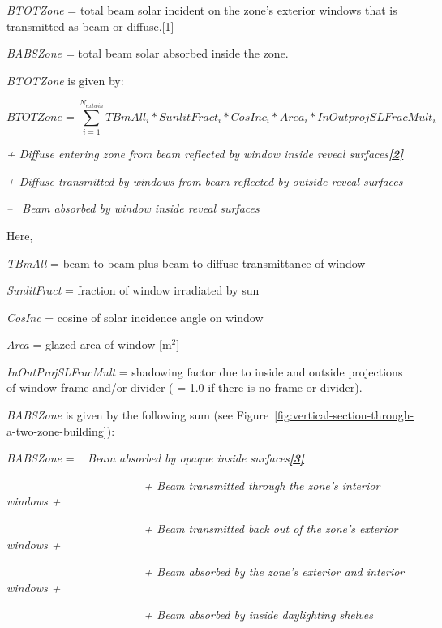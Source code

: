 \emph{BTOTZone} = total beam solar incident on the zone's exterior windows that is transmitted as beam or diffuse.\protect\hyperlink{ux5fftn1}{{[}1{]}}

\emph{BABSZone =} total beam solar absorbed inside the zone.

\emph{BTOTZone} is given by:

\begin{equation}
BTOTZone = \sum\limits_{i = 1}^{{N_{extwin}}} {TBmAl{l_i}*SunlitFrac{t_i}*CosIn{c_i}*Are{a_i}*InOutprojSLFracMul{t_i}}
\end{equation}

\emph{+ Diffuse entering zone from beam reflected by window inside reveal surfaces\protect\hyperlink{ux5fftn2}{\textbf{{[}2{]}}}}

\emph{+ Diffuse transmitted by windows from beam reflected by outside reveal surfaces}

\emph{--~ Beam absorbed by window inside reveal surfaces}

Here,

\emph{TBmAll} = beam-to-beam plus beam-to-diffuse transmittance of window

\emph{SunlitFract} = fraction of window irradiated by sun

\emph{CosInc} = cosine of solar incidence angle on window

\emph{Area} = glazed area of window {[}m\(^{2}\){]}

\emph{InOutProjSLFracMult} = shadowing factor due to inside and outside projections of window frame and/or divider ( = 1.0 if there is no frame or divider).

\emph{BABSZone} is given by the following sum (see Figure~\ref{fig:vertical-section-through-a-two-zone-building}):

\emph{BABSZone} = ~ \emph{Beam absorbed by opaque inside surfaces\protect\hyperlink{ux5fftn3}{\textbf{{[}3{]}}}}

\emph{~~~~~~~~~~~~~~~~~~~~~~~ + Beam transmitted through the zone's interior windows +}

\emph{~~~~~~~~~~~~~~~~~~~~~~~ + Beam transmitted back out of the zone's exterior windows +}

\emph{~~~~~~~~~~~~~~~~~~~~~~~ + Beam absorbed by the zone's exterior and interior windows +}

\emph{~~~~~~~~~~~~~~~~~~~~~~~ + Beam absorbed by inside daylighting shelves}

